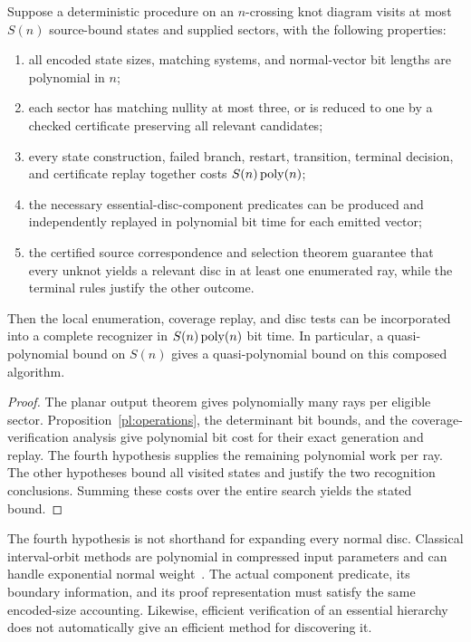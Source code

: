 \begin{corollary}
\label{res:conditional}
Suppose a deterministic procedure on an \(n\)-crossing knot diagram
visits at most \(S(n)\) source-bound states and supplied sectors,
with the following properties:
\begin{enumerate}
\item all encoded state sizes, matching systems, and normal-vector
bit lengths are polynomial in \(n\);
\item each sector has matching nullity at most three, or is reduced
to one by a checked certificate preserving all relevant candidates;
\item every state construction, failed branch, restart, transition,
terminal decision, and certificate replay together costs
\(S(n)\operatorname{poly}(n)\);
\item the necessary essential-disc-component predicates can be
produced and independently replayed in polynomial bit time for
each emitted vector;
\item the certified source correspondence and selection theorem
guarantee that every unknot yields a relevant disc in at least one
enumerated ray, while the terminal rules justify the other outcome.
\end{enumerate}
Then the local enumeration, coverage replay, and disc tests can be
incorporated into a complete recognizer in \(S(n)\operatorname{poly}(n)\) bit time.
In particular, a quasi-polynomial bound on \(S(n)\) gives a
quasi-polynomial bound on this composed algorithm.
\end{corollary}
\begin{proof}
The planar output theorem gives polynomially many rays per eligible
sector.  Proposition~\ref{pl:operations}, the determinant bit bounds,
and the coverage-verification analysis give polynomial bit cost for
their exact generation and replay.  The fourth hypothesis supplies
the remaining polynomial work per ray.  The other hypotheses bound
all visited states and justify the two recognition conclusions.
Summing these costs over the entire search yields the stated bound.
\end{proof}

The fourth hypothesis is not shorthand for expanding every normal
disc.  Classical interval-orbit methods are polynomial in compressed
input parameters and can handle exponential normal
weight~\cite{AHT2006}.  The actual component predicate, its boundary
information, and its proof representation must satisfy the same
encoded-size accounting.  Likewise, efficient verification of an
essential hierarchy does not automatically give an efficient method
for discovering it.

